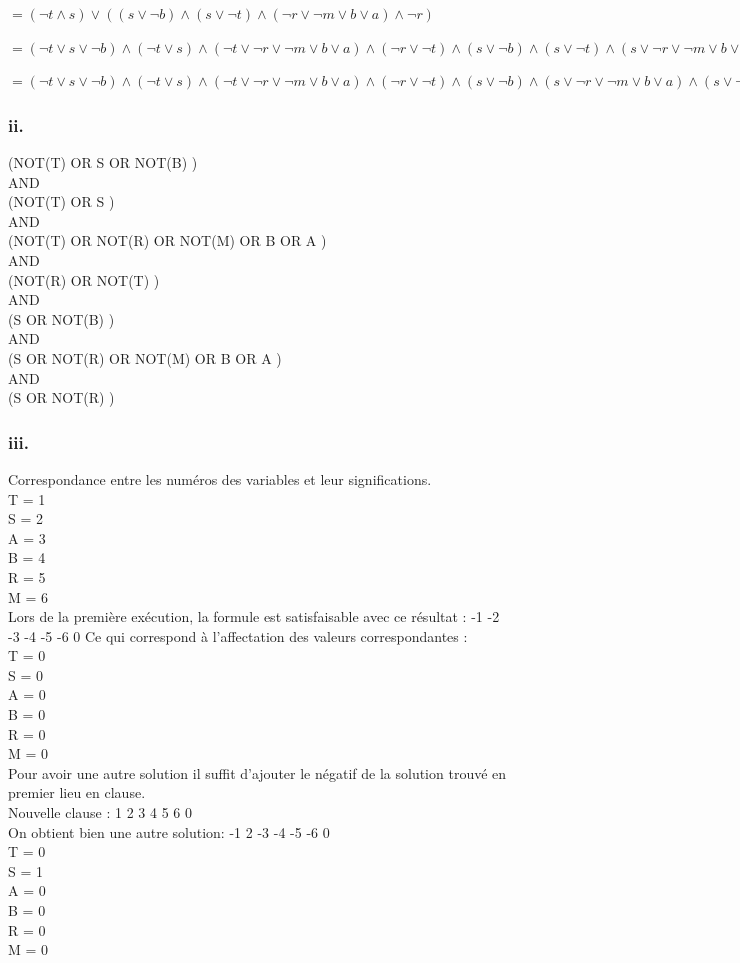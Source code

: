 \documentclass[12pt]{report}
\begin{document}
$= (\lnot t \land s) \lor ((s \lor \lnot b) \land (s\lor \lnot t) \land (\lnot r \lor \lnot m \lor b \lor a) \land \lnot r)$

$= (\lnot t \lor s \lor \lnot b) \land (\lnot t \lor s) \land (\lnot t \lor \lnot r \lor \lnot m \lor b \lor a) \land (\lnot r \lor \lnot t) \land (s \lor \lnot b) \land (s \lor \lnot t) \land (s \lor \lnot r \lor \lnot m \lor b \lor a) \land (\lnot r \lor s)$

$= (\lnot t \lor s \lor \lnot b) \land (\lnot t \lor s) \land (\lnot t \lor \lnot r \lor \lnot m \lor b \lor a) \land (\lnot r \lor \lnot t) \land (s \lor \lnot b) \land (s \lor \lnot r \lor \lnot m \lor b \lor a) \land (s \lor \lnot r)$

\subsubsection*{ii.}
(NOT(T) OR S OR NOT(B) ) \\
AND \\
(NOT(T) OR S ) \\
AND \\
(NOT(T) OR NOT(R) OR NOT(M) OR B OR A ) \\
AND \\
(NOT(R) OR NOT(T) ) \\
AND \\
(S OR NOT(B) ) \\
AND \\
(S OR NOT(R) OR NOT(M) OR B OR A ) \\
AND \\
(S OR NOT(R) )

\subsubsection*{iii.}
Correspondance entre les numéros des variables et leur significations. \\
T = 1 \\
S = 2 \\
A = 3 \\
B = 4 \\
R = 5 \\
M = 6 \\
Lors de la première exécution, la formule est satisfaisable avec ce résultat : -1 -2 -3 -4 -5 -6 0
Ce qui correspond à l'affectation des valeurs correspondantes : \\
T = 0 \\
S = 0 \\
A = 0 \\
B = 0 \\
R = 0 \\
M = 0 \\
Pour avoir une autre solution il suffit d'ajouter le négatif de la solution trouvé en premier lieu en clause. \\
Nouvelle clause :  1 2 3 4 5 6 0 \\
On obtient bien une autre solution: -1 2 -3 -4 -5 -6 0 \\
T = 0 \\
S = 1 \\
A = 0 \\
B = 0 \\
R = 0 \\
M = 0 
\end{document}
